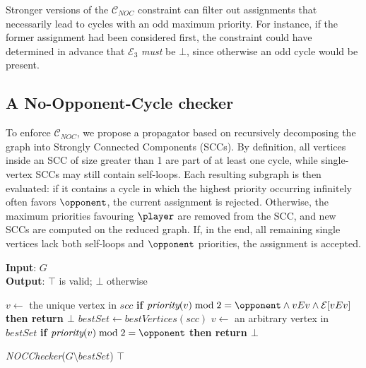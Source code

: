 \documentclass[runningheads]{llncs}
\begin{document}
Stronger versions of the $\mathcal{C}_{\!N\!O\!C}$ constraint can filter out assignments that necessarily lead to cycles with an odd maximum priority. For instance, if the former assignment had been considered first, the constraint could have determined in advance that $\mathcal{E}_3$ \textit{must} be $\bot$, since otherwise an odd cycle would be present.

\subsection{A No-Opponent-Cycle checker} \label{sec:nocchecker}
To enforce $\mathcal{C}_{\!N\!O\!C}$, we propose a propagator based on recursively decomposing the graph into Strongly Connected Components (SCCs). By definition, all vertices inside an SCC of size greater than 1 are part of at least one cycle, while single-vertex SCCs may still contain self-loops.
%
Each resulting subgraph is then evaluated: if it contains a cycle in which the highest priority occurring infinitely often favors $\opponent$, the current assignment is rejected. Otherwise, the maximum priorities favouring $\player$ are removed from the SCC, and new SCCs are computed on the reduced graph.
%
If, in the end, all remaining single vertices lack both self-loops and $\opponent$ priorities, the assignment is accepted.

\begin{algorithm}[htb]
\small
\caption{\textbf{\textit{NOCChecker}}}
\textbf{Input}: $G$ \\
\textbf{Output}: $\top$ is valid; $\bot$ otherwise
\begin{algorithmic}[1]
     \label{alg:noc-checker:breakingdown}
         \label{alg:noc-checker:single}
            \STATE $v \gets$ the unique vertex in $scc$
            \STATE \textbf{if }$\textit{priority}(v) \bmod 2 = \opponent \land vEv\land \mathcal{E}[vEv]$ \textbf{then return $\bot$} \label{alg:noc-checker:self}  
        \ELSE
            \STATE $bestSet \gets \textit{bestVertices}(scc)$ \label{alg:noc-checker:best}
            \STATE $v \gets$ an arbitrary vertex in $bestSet$
            \STATE \textbf{if }$\textit{priority}(v) \bmod 2 = \opponent$ \textbf{then return $\bot$} \label{alg:noc-checker:opponent}  

            \STATE \textit{NOCChecker}($G \setminus bestSet$) \label{alg:noc-checker:recursion}
        \ENDIF
    \ENDFOR
    \RETURN $\top$
\end{algorithmic}
\label{alg:noc-checker}
\end{algorithm}
\end{document}
